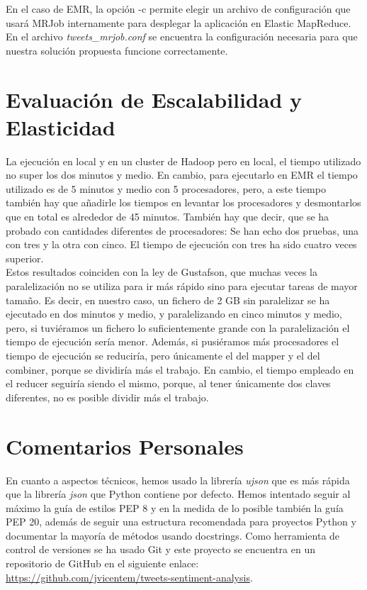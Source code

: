 \documentclass[12pt,a4paper]{article}
\begin{document}
En el caso de EMR, la opción -c permite elegir un archivo de configuración que usará MRJob internamente para desplegar la aplicación en Elastic MapReduce. En el archivo \textit{tweets\_mrjob.conf} se encuentra la configuración necesaria para que nuestra solución propuesta funcione correctamente.

\section{Evaluación de Escalabilidad y Elasticidad}

La ejecución en local y en un cluster de Hadoop pero en local, el tiempo  utilizado no super los dos minutos y medio. En cambio, para ejecutarlo en EMR el tiempo utilizado es de 5 minutos y medio con 5 procesadores, pero, a este tiempo también hay que añadirle los tiempos en levantar los procesadores y desmontarlos que en total es alrededor de 45 minutos. También hay que decir, que se ha probado con cantidades diferentes de procesadores: Se han echo dos pruebas, una con tres y la otra con cinco. El tiempo de ejecución con tres ha sido cuatro veces superior.\\

Estos resultados coinciden con la ley de Gustafson, que muchas veces la paralelización no se utiliza para ir más rápido sino para ejecutar tareas de mayor tamaño. Es decir, en nuestro caso, un fichero de 2 GB sin paralelizar se ha ejecutado en dos minutos y medio, y paralelizando en cinco minutos y medio, pero, si tuviéramos un fichero lo suficientemente grande con la paralelización el tiempo de ejecución sería menor. Además, si pusiéramos más procesadores el tiempo de ejecución se reduciría, pero únicamente el del mapper y el del combiner, porque se dividiría más el trabajo. En cambio, el tiempo empleado en el reducer seguiría siendo el mismo, porque, al tener únicamente dos claves diferentes, no es posible dividir más el trabajo.

\section{Comentarios Personales}

En cuanto a aspectos técnicos, hemos usado la librería \textit{ujson} que es más rápida que la librería \textit{json} que Python contiene por defecto. Hemos intentado seguir al máximo la guía de estilos PEP 8 y en la medida de lo posible también la guía PEP 20, además de seguir una estructura recomendada para proyectos Python y documentar la mayoría de métodos usando docstrings.
Como herramienta de control de versiones se ha usado Git y este proyecto se encuentra en un repositorio de GitHub en el siguiente enlace: \url{https://github.com/jvicentem/tweets-sentiment-analysis}.\\
\end{document}
